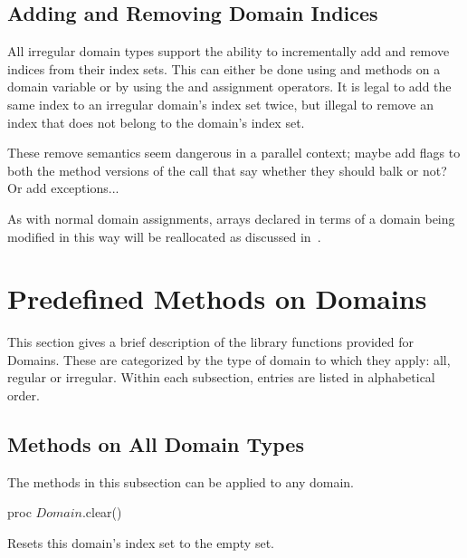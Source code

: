 \subsection{Adding and Removing Domain Indices}
\label{Adding_and_Removing_Domain_Indices}

All irregular domain types support the ability to incrementally add
and remove indices from their index sets.  This can either be done
using  and  methods on a
domain variable or by using the \chpl{+=} and \chpl{-=} assignment
operators.  It is legal to add the same index to an irregular domain's
index set twice, but illegal to remove an index that does not belong
to the domain's index set.

\begin{openissue}
These remove semantics seem dangerous in a parallel context; maybe
add flags to both the method versions of the call that say whether
they should balk or not?  Or add exceptions...
\end{openissue}

As with normal domain assignments, arrays declared in terms of a
domain being modified in this way will be reallocated as discussed
in~.



\section{Predefined Methods on Domains}

This section gives a brief description of the library functions provided for
Domains.  These are categorized by the type of domain to which they apply: all,
regular or irregular.  Within each subsection, entries are listed in
alphabetical order.

\subsection{Methods on All Domain Types}

The methods in this subsection can be applied to any domain.

\begin{protohead}
proc $Domain$.clear()
\end{protohead}
\begin{protobody}
Resets this domain's index set to the empty set.
\end{protobody}


